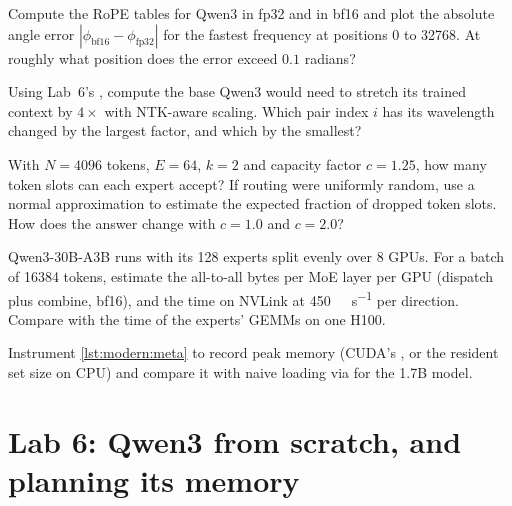 \begin{exercise}
Compute the RoPE tables for Qwen3 in fp32 and in bf16 and plot the absolute angle error
$|\phi_\text{bf16}-\phi_\text{fp32}|$ for the fastest frequency at positions 0 to \num{32768}. At roughly
what position does the error exceed $0.1$ radians?
\end{exercise}

\begin{exercise}
Using Lab~6's , compute the base Qwen3 would need to stretch its trained context
by $4\times$ with NTK-aware scaling. Which pair index $i$ has its wavelength changed by the largest factor,
and which by the smallest?
\end{exercise}

\begin{exercise}
With $N=4096$ tokens, $E=64$, $k=2$ and capacity factor $c=1.25$, how many token slots can each expert
accept? If routing were uniformly random, use a normal approximation to estimate the expected fraction of
dropped token slots. How does the answer change with $c=1.0$ and $c=2.0$?
\end{exercise}

\begin{exercise}
Qwen3-30B-A3B runs with its 128 experts split evenly over 8 GPUs. For a batch of \num{16384} tokens,
estimate the all-to-all bytes per MoE layer per GPU (dispatch plus combine, bf16), and the time on
NVLink at \SI{450}{\giga\byte\per\second} per direction. Compare with the time of the experts' GEMMs on
one H100.
\end{exercise}

\begin{exercise}
Instrument \cref{lst:modern:meta} to record peak memory (CUDA's , or the
resident set size on CPU) and compare it with naive loading via  for the 1.7B
model.
\end{exercise}

\section{Lab 6: Qwen3 from scratch, and planning its memory}\label{sec:modern:lab}

